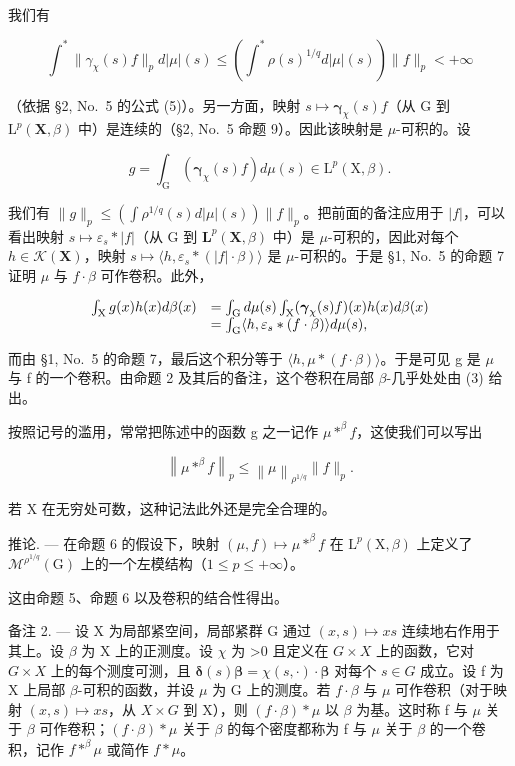 我们有

\[
\int^ {*} \| \gamma_ {\chi} (s) f \| _ {p} d | \mu | (s) \leqslant \left(\int^ {*} \rho (s) ^ {1 / q} d | \mu | (s)\right) \| f \| _ {p} <   + \infty
\]

（依据 §2, No.~5 的公式 (5)）。另一方面，映射 \(s \mapsto \pmb{\gamma}_{\chi}(s)f\)（从 G 到 \(\mathrm{L}^p (\mathbf{X},\beta)\) 中）是连续的（§2, No.~5 命题 9）。因此该映射是 \(\mu\)-可积的。设

\[
g = \int_ {\mathrm{G}} \left(\boldsymbol {\gamma} _ {\chi} (s) f\right) d \mu (s) \in \mathrm{L} ^ {p} (\mathrm{X}, \beta).
\]

我们有 \(\| g\| _p\leqslant \left(\int \rho^{1 / q}(s)d|\mu |(s)\right)\| f\| _p\)。把前面的备注应用于 \(|f|\)，可以看出映射 \(s\mapsto \varepsilon_s*\mid f|\)（从 G 到 \(\mathbf{L}^p (\mathbf{X},\beta)\) 中）是 \(\mu\)-可积的，因此对每个 \(h\in \mathcal{K}(\mathbf{X})\)，映射 \(s\mapsto \langle h,\varepsilon_s*(|f|\cdot \beta)\rangle\) 是 \(\mu\)-可积的。于是 §1, No.~5 的命题 7 证明 \(\mu\) 与 \(f\cdot \beta\) 可作卷积。此外，

\[
\begin{array}{r l} \int_ {\mathrm{X}} g (x) h (x) d \beta (x) & = \int_ {\mathrm{G}} d \mu (s) \int_ {\mathrm{X}} (\boldsymbol {\gamma} _ {\chi} (s) f) (x) h (x) d \beta (x) \\ & = \int_ {\mathrm{G}} \langle h, \varepsilon_ {s} * (f \cdot \beta) \rangle d \mu (s), \end{array}
\]

而由 §1, No.~5 的命题 7，最后这个积分等于 \(\langle h, \mu * (f \cdot \beta) \rangle\)。于是可见 g 是 \(\mu\) 与 f 的一个卷积。由命题 2 及其后的备注，这个卷积在局部 \(\beta\)-几乎处处由 (3) 给出。

按照记号的滥用，常常把陈述中的函数 g 之一记作 \(\mu * ^ {\beta} f\)，这使我们可以写出

\[
\left\| \mu * ^ {\beta} f \right\| _ {p} \leqslant \left\| \mu \right\| _ {\rho^ {1 / q}} \| f \| _ {p}.
\]

若 X 在无穷处可数，这种记法此外还是完全合理的。

推论. --- 在命题 6 的假设下，映射 \((\mu, f) \mapsto \mu *^{\beta} f\) 在 \(\mathrm{L}^{p}(\mathrm{X}, \beta)\) 上定义了 \(\mathcal{M}^{\rho^{1/q}}(\mathrm{G})\) 上的一个左模结构（\(1 \leqslant p \leqslant +\infty\)）。

这由命题 5、命题 6 以及卷积的结合性得出。

备注 2. --- 设 X 为局部紧空间，局部紧群 G 通过 \((x,s)\mapsto xs\) 连续地右作用于其上。设 \(\beta\) 为 X 上的正测度。设 \(\chi\) 为 \textgreater0 且定义在 \(G\times X\) 上的函数，它对 \(G\times X\) 上的每个测度可测，且 \(\boldsymbol{\delta}(s)\boldsymbol{\beta}=\chi(s,\cdot)\cdot\boldsymbol{\beta}\) 对每个 \(s\in G\) 成立。设 f 为 X 上局部 \(\beta\)-可积的函数，并设 \(\mu\) 为 G 上的测度。若 \(f\cdot\beta\) 与 \(\mu\) 可作卷积（对于映射 \((x,s)\mapsto xs\)，从 \(X\times G\) 到 X），则 \((f\cdot\beta)*\mu\) 以 \(\beta\) 为基。这时称 f 与 \(\mu\) 关于 \(\beta\) 可作卷积；\((f\cdot\beta)*\mu\) 关于 \(\beta\) 的每个密度都称为 f 与 \(\mu\) 关于 \(\beta\) 的一个卷积，记作 \(f * ^ {\beta} \mu\) 或简作 \(f*\mu\)。

